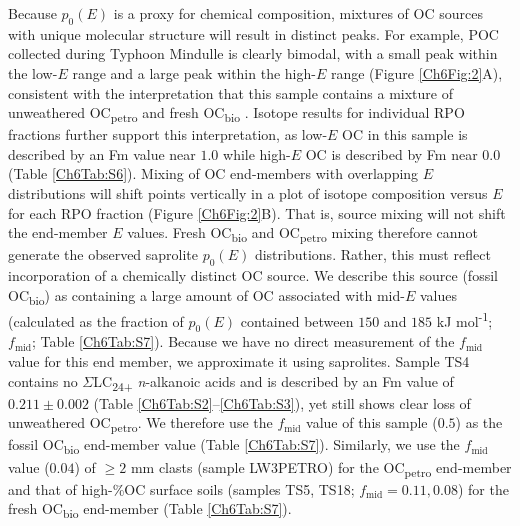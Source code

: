 Because $p_{0}(E)$ is a proxy for chemical composition, mixtures of OC sources with unique molecular structure will result in distinct peaks. For example, POC collected during Typhoon Mindulle is clearly bimodal, with a small peak within the low-$E$ range and a large peak within the high-$E$ range (Figure \ref{Ch6Fig:2}A), consistent with the interpretation that this sample contains a mixture of unweathered OC\textsubscript{petro} and fresh OC\textsubscript{bio} \citep{Hilton:2008fo}. Isotope results for individual RPO fractions further support this interpretation, as low-$E$ OC in this sample is described by an Fm value near $1.0$ while high-$E$ OC is described by Fm near $0.0$ (Table \ref{Ch6Tab:S6}). Mixing of OC end-members with overlapping $E$ distributions will shift points vertically in a plot of isotope composition versus $E$ for each RPO fraction (Figure \ref{Ch6Fig:2}B). That is, source mixing will not shift the end-member $E$ values. Fresh OC\textsubscript{bio} and OC\textsubscript{petro} mixing therefore cannot generate the observed saprolite $p_{0}(E)$ distributions. Rather, this must reflect incorporation of a chemically distinct OC source. We describe this source (fossil OC\textsubscript{bio}) as containing a large amount of OC associated with mid-$E$ values (calculated as the fraction of $p_{0}(E)$ contained between $150$ and $185$ kJ mol\textsuperscript{-1}; $f_{\text{mid}}$; Table \ref{Ch6Tab:S7}). Because we have no direct measurement of the $f_{\text{mid}}$ value for this end member, we approximate it using saprolites. Sample TS4 contains no $\Sigma$LC\textsubscript{24+} \textit{n}-alkanoic acids and is described by an Fm value of $0.211 \pm 0.002$ (Table \ref{Ch6Tab:S2}--\ref{Ch6Tab:S3}), yet still shows clear loss of unweathered OC\textsubscript{petro}. We therefore use the $f_{\text{mid}}$ value of this sample ($0.5$) as the fossil OC\textsubscript{bio} end-member value (Table \ref{Ch6Tab:S7}). Similarly, we use the $f_{\text{mid}}$ value ($0.04$) of $\geq 2$ mm clasts (sample LW3PETRO) for the OC\textsubscript{petro} end-member and that of high-\%OC surface soils (samples TS5, TS18; $f_{\text{mid}} = 0.11, 0.08$) for the fresh OC\textsubscript{bio} end-member (Table \ref{Ch6Tab:S7}).

